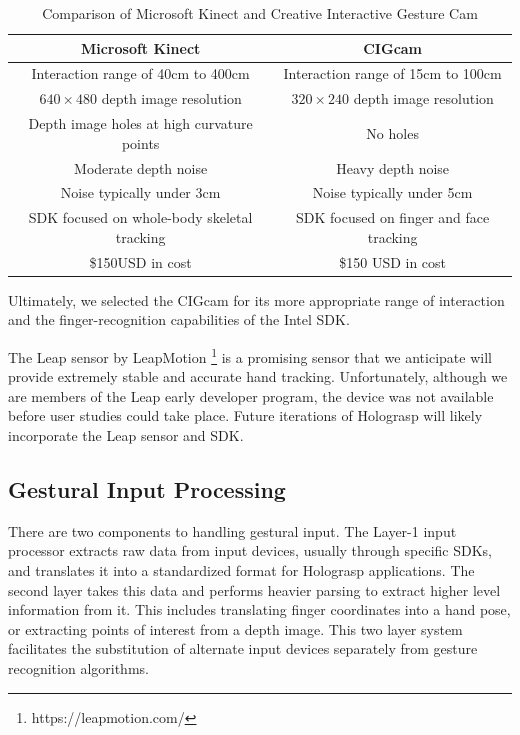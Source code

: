 \documentclass[pageno]{jpaper}
\begin{document}
\begin{table}[h]
\begin{tabular}{|c|c|}
\hline
\bf{Microsoft Kinect} & \bf{CIGcam} \\ \hline
Interaction range of 40cm to 400cm & Interaction range of 15cm to 100cm \\
$640 \times 480$ depth image resolution & $320 \times 240$ depth image resolution \\
Depth image holes at high curvature points & No holes \\
Moderate depth noise & Heavy depth noise \\
Noise typically under 3cm & Noise typically under 5cm \\
SDK focused on whole-body skeletal tracking & SDK focused on finger and face tracking \\
\$150USD in cost & \$150 USD in cost \\
\hline
\end{tabular}
\caption{Comparison of Microsoft Kinect and Creative Interactive Gesture Cam}
\label{tab:comparison}
\end{table}

Ultimately, we selected the CIGcam for its more appropriate range of interaction and the finger-recognition
capabilities of the Intel SDK.

The Leap sensor by LeapMotion \footnote{https://leapmotion.com/} is a promising sensor that we anticipate will provide extremely stable and
accurate hand tracking. Unfortunately, although we are members of the Leap early developer program, the device was not available
before user studies could take place. Future iterations of Holograsp will likely incorporate the Leap sensor and SDK.

\subsection{Gestural Input Processing}
There are two components to handling gestural input. The Layer-1 input processor extracts raw data from input devices, usually through specific
SDKs, and translates it into a standardized format for Holograsp applications. The second layer takes this data and performs heavier
parsing to extract higher level information from it. This includes translating finger coordinates into a hand pose, or extracting
points of interest from a depth image. This two layer system facilitates the substitution of alternate input devices separately from
gesture recognition algorithms.
\end{document}
